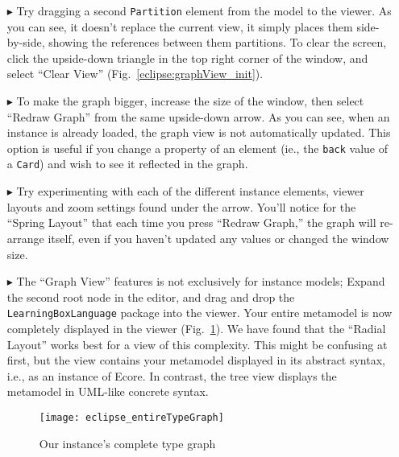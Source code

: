 \begin{itemize}
\item[$\blacktriangleright$] Try dragging a second \texttt{Partition} element from the model to the viewer. As you can see, it doesn't replace the current
view, it simply places them side-by-side, showing the references between them partitions. To clear the screen, click the upside-down triangle in the top
right corner of the window, and select ``Clear View'' (Fig.~\ref{eclipse:graphView_init}).

\item[$\blacktriangleright$] To make the graph bigger, increase the size of the window, then select ``Redraw Graph'' from the same upside-down arrow. As you can
see, when an instance is already loaded, the graph view is not automatically updated. This option is useful if you change a property of an element (ie., the
\texttt{back} value of a \texttt{Card}) and wish to see it reflected in the graph.

\item[$\blacktriangleright$] Try experimenting with each of the different instance elements, viewer layouts and zoom settings found under the arrow. You'll
notice for the ``Spring Layout'' that each time you press ``Redraw Graph,'' the graph will re-arrange itself, even if you haven't updated any values or changed the window size.

\item[$\blacktriangleright$] The ``Graph View'' features is not exclusively for instance models; Expand the second root node in the editor, and drag and
drop the \texttt{LearningBoxLanguage} package into the viewer. Your entire metamodel is now completely displayed in the viewer
(Fig.~\ref{eclipse:graphView_typeGraph}). We have found that the ``Radial Layout'' works best for a view of this complexity. This might be confusing at first,
but the view contains your metamodel displayed in its abstract syntax, i.e., as an instance of Ecore. In contrast, the tree view displays the metamodel in UML-like
concrete syntax.

\vspace{1cm}

\begin{figure}[htbp]
	\centering
  \texttt{[image: eclipse\_entireTypeGraph]}
	\caption{Our instance's complete type graph}
	\label{eclipse:graphView_typeGraph}
\end{figure}


\end{itemize}
